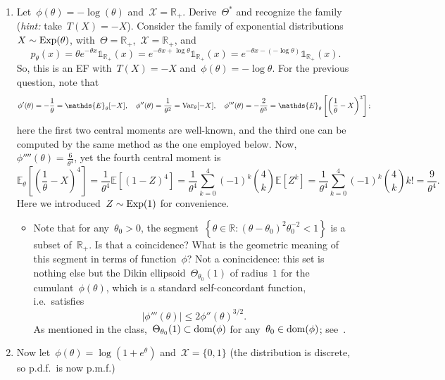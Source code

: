 \documentclass[11pt]{article}
\newcommand{\odima}[1]{{\color{red} #1}}
\newcommand{\R}{\mathds{R}}
\newcommand{\E}{\mathds{E}}
\newcommand{\Var}{\textup{Var}}
\newcommand{\cX}{\mathcal{X}}
\newcommand{\leqs}{\leqslant}
\renewcommand{\le}{\leqs}
\begin{document}
\begin{enumerate}
\item Let~$\phi(\theta) = -\log(\theta)$ and~$\mathcal{X} = \R_+$. Derive~$\Theta^*$ and recognize the family ({\em hint:} take~$T(X) = -X$).
\odima{Consider the family of exponential distributions~$X \sim \textup{Exp}(\theta)$, with~$\Theta = \R_+$,~$\cX = \R_+$, and
\[
p_{\theta}(x) 
= \theta e^{-\theta x} \mathds{1}_{\R_+}(x)
= e^{-\theta x + \log\theta} \mathds{1}_{\R_+}(x)
= e^{-\theta x - (- \log\theta)} \mathds{1}_{\R_+}(x).
\]
So, this is an EF with~$T(X) = -X$ and~$\phi(\theta) = -\log\theta$. 
For the previous question, note that
\[
\phi'(\theta) = -\frac{1}{\theta} = \E_{\theta}[-X], \quad
\phi''(\theta) = \frac{1}{\theta^2} = \Var_{\theta}[-X], \quad
\phi'''(\theta) = -\frac{2}{\theta^3} = \E_{\theta}\left[ \left(\frac{1}{\theta} - X \right)^3\right];
\]
here the first two central moments are well-known, and the third one can be computed by the same method as the one employed below.
Now,~$\phi''''(\theta) = \frac{6}{\theta^4}$, yet the fourth central moment is
\[
\E_{\theta}\left[ \left(\frac{1}{\theta} - X \right)^4\right] 
= \frac{1}{\theta^4} \E\left[ \left(1 - Z \right)^4\right] 
= \frac{1}{\theta^4} \sum_{k = 0}^4 (-1)^k {4 \choose k} \E [Z^k]
= \frac{1}{\theta^4} \sum_{k = 0}^4 (-1)^k {4 \choose k} k!
= \frac{9}{\theta^4}.
\]
Here we introduced~$Z \sim \textup{Exp}(1)$ for convenience.
}
\begin{itemize}
\item Note that for any~$\theta_0 > 0$, the segment~$\left\{ \theta \in \R: {(\theta - \theta_0)^2}{\theta_0^{-2}} < 1 \right\}$ is a subset of~$\R_+$. Is that a coincidence? What is the geometric meaning of this segment in terms of function~$\phi$?
\odima{Not a conincidence: this set is nothing else but the Dikin ellipsoid~$\Theta_{\theta_0}(1)$ of radius~$1$ for the cumulant~$\phi(\theta)$, which is a standard self-concordant function, i.e.~satisfies
\[
|\phi'''(\theta)| \le 2\phi''(\theta)^{3/2}. 
\]
As mentioned in the class,~$\Theta_{\theta_0}(1) \subset \textup{dom}(\phi)$ for any~$\theta_0 \in \textup{dom}(\phi)$; see~\cite[Thm.~4.1.5]{nesterov2013introductory}.
}
\end{itemize}
\item Now let~$\phi(\theta) = \log(1 + e^{\theta})$ and~$\cX = \{0,1\}$ (the distribution is discrete, so p.d.f.~is now p.m.f.) 


\end{enumerate}
\end{document}
